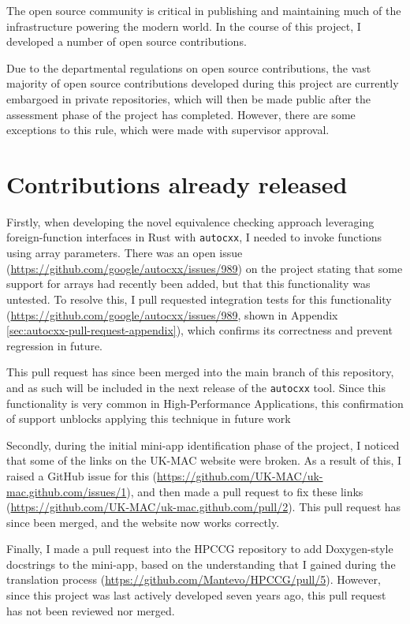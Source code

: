 The open source community is critical in publishing and maintaining much of the infrastructure powering the modern world. In the course of this project, I developed a number of open source contributions.

Due to the departmental regulations on open source contributions, the vast majority of open source contributions developed during this project are currently embargoed in private repositories, which will then be made public after the assessment phase of the project has completed. However, there are some exceptions to this rule, which were made with supervisor approval.

\section{Contributions already released}
\label{ssec:open-source-already-released}

Firstly, when developing the novel equivalence checking approach leveraging foreign-function interfaces in Rust with \texttt{autocxx}, I needed to invoke functions using array parameters. There was an open issue (\url{https://github.com/google/autocxx/issues/989}) on the project stating that some support for arrays had recently been added, but that this functionality was untested. To resolve this, I pull requested integration tests for this functionality (\url{https://github.com/google/autocxx/issues/989}, shown in Appendix \ref{sec:autocxx-pull-request-appendix}), which confirms its correctness and prevent regression in future.

This pull request has since been merged into the main branch of this repository, and as such will be included in the next release of the \texttt{autocxx} tool. Since this functionality is very common in High-Performance Applications, this confirmation of support unblocks applying this technique in future work

Secondly, during the initial \acrshort{mini-app} identification phase of the project, I noticed that some of the links on the UK-MAC website were broken. As a result of this, I raised a GitHub issue for this (\url{https://github.com/UK-MAC/uk-mac.github.com/issues/1}), and then made a pull request to fix these links (\url{https://github.com/UK-MAC/uk-mac.github.com/pull/2}). This pull request has since been merged, and the website now works correctly.

Finally, I made a pull request into the HPCCG repository to add Doxygen-style docstrings to the \acrshort{mini-app}, based on the understanding that I gained during the translation process (\url{https://github.com/Mantevo/HPCCG/pull/5}). However, since this project was last actively developed seven years ago, this pull request has not been reviewed nor merged.


